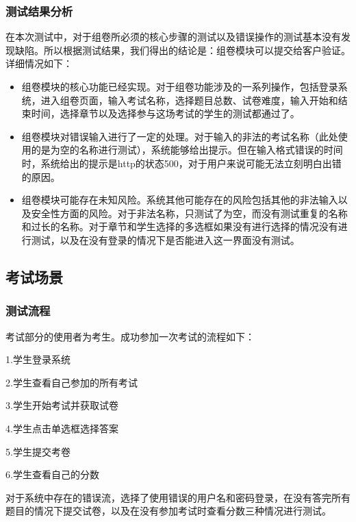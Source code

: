 \documentclass[hyperref, a4paper]{ctexart}
\begin{document}
\hypertarget{ux6d4bux8bd5ux7ed3ux679cux5206ux6790-1}{%
\subsubsection{测试结果分析}\label{ux6d4bux8bd5ux7ed3ux679cux5206ux6790-1}}

在本次测试中，对于组卷所必须的核心步骤的测试以及错误操作的测试基本没有发现缺陷。所以根据测试结果，我们得出的结论是：组卷模块可以提交给客户验证。详细情况如下：

\begin{itemize}
\item
  组卷模块的核心功能已经实现。对于组卷功能涉及的一系列操作，包括登录系统，进入组卷页面，输入考试名称，选择题目总数、试卷难度，输入开始和结束时间，选择章节以及选择参与这场考试的学生的测试都通过了。
\item
  组卷模块对错误输入进行了一定的处理。对于输入的非法的考试名称（此处使用的是为空的名称进行测试），系统能够给出提示。但在输入格式错误的时间时，系统给出的提示是http的状态500，对于用户来说可能无法立刻明白出错的原因。
\item
  组卷模块可能存在未知风险。系统其他可能存在的风险包括其他的非法输入以及安全性方面的风险。对于非法名称，只测试了为空，而没有测试重复的名称和过长的名称。对于章节和学生选择的多选框如果没有进行选择的情况没有进行测试，以及在没有登录的情况下是否能进入这一界面没有测试。
\end{itemize}

\hypertarget{ux8003ux8bd5ux573aux666f}{%
\subsection{考试场景}\label{ux8003ux8bd5ux573aux666f}}

\hypertarget{ux6d4bux8bd5ux6d41ux7a0b-2}{%
\subsubsection{测试流程}\label{ux6d4bux8bd5ux6d41ux7a0b-2}}

考试部分的使用者为考生。成功参加一次考试的流程如下：

1.学生登录系统

2.学生查看自己参加的所有考试

3.学生开始考试并获取试卷

4.学生点击单选框选择答案

5.学生提交考卷

6.学生查看自己的分数

对于系统中存在的错误流，选择了使用错误的用户名和密码登录，在没有答完所有题目的情况下提交试卷，以及在没有参加考试时查看分数三种情况进行测试。
\end{document}
